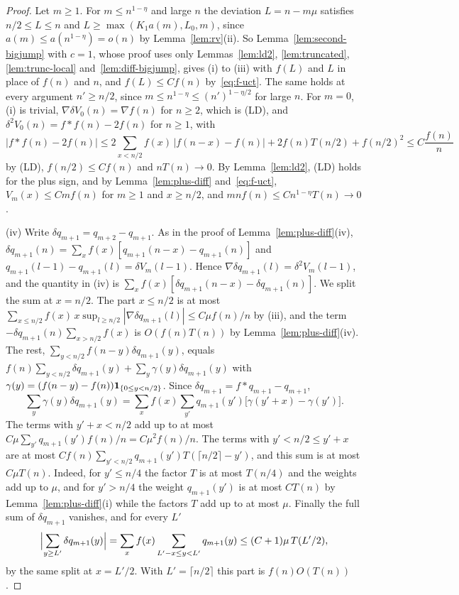 \begin{proof}
Let $m\ge1$. For $m\le n^{1-\eta}$ and large $n$ the deviation $L=n-m\mu$ satisfies
$n/2\le L\le n$ and $L\ge\max(K_1a(m),L_0,m)$, since $a(m)\le a(n^{1-\eta})=o(n)$ by
Lemma~\ref{lem:rv}(ii). So Lemma~\ref{lem:second-bigjump} with $c=1$, whose proof uses only
Lemmas~\ref{lem:ld2}, \ref{lem:truncated}, \ref{lem:trunc-local} and~\ref{lem:diff-bigjump}, gives
(i) to (iii) with $f(L)$ and $L$ in place of $f(n)$ and $n$, and $f(L)\le Cf(n)$
by~\eqref{eq:f-uct}. The same holds at every argument $n'\ge n/2$, since
$m\le n^{1-\eta}\le(n')^{1-\eta/2}$ for large $n$. For $m=0$, (i) is trivial,
$\nabla\delta V_0(n)=\nabla f(n)$ for $n\ge2$, which is (LD), and
$\delta^2V_0(n)=f*f(n)-2f(n)$ for $n\ge1$, with
\[
 |f*f(n)-2f(n)|\le2\sum_{x<n/2}f(x)\,|f(n-x)-f(n)|+2f(n)T(n/2)+f(n/2)^2\le C\frac{f(n)}n
\]
by (LD), $f(n/2)\le Cf(n)$ and $nT(n)\to0$. By Lemma~\ref{lem:ld2}, (LD) holds for the plus
sign, and by Lemma~\ref{lem:plus-diff} and~\eqref{eq:f-uct}, $V_m(x)\le Cmf(n)$ for $m\ge1$ and
$x\ge n/2$, and $mnf(n)\le Cn^{1-\eta}T(n)\to0$.

(iv) Write $\delta q_{m+1}=q_{m+2}-q_{m+1}$. As in the proof of Lemma~\ref{lem:plus-diff}(iv),
$\delta q_{m+1}(n)=\sum_xf(x)[q_{m+1}(n-x)-q_{m+1}(n)]$ and $q_{m+1}(l-1)-q_{m+1}(l)=\delta V_m(l-1)$.
Hence $\nabla\delta q_{m+1}(l)=\delta^2V_m(l-1)$, and the quantity in (iv) is
$\sum_xf(x)[\delta q_{m+1}(n-x)-\delta q_{m+1}(n)]$. We split the sum at $x=n/2$. The
part $x\le n/2$ is at most $\sum_{x\le n/2}f(x)\,x\sup_{l\ge n/2}|\nabla\delta q_{m+1}(l)|\le C\mu f(n)/n$
by (iii), and the term $-\delta q_{m+1}(n)\sum_{x>n/2}f(x)$ is $O(f(n)T(n))$ by
Lemma~\ref{lem:plus-diff}(iv). The rest, $\sum_{y<n/2}f(n-y)\delta q_{m+1}(y)$, equals
$f(n)\sum_{y<n/2}\delta q_{m+1}(y)+\sum_y\gamma(y)\delta q_{m+1}(y)$ with
$\gamma(y)=(f(n-y)-f(n))\mathbf{1}_{\{0\le y<n/2\}}$. Since
$\delta q_{m+1}=f*q_{m+1}-q_{m+1}$,
\[
 \sum_y\gamma(y)\delta q_{m+1}(y)=\sum_xf(x)\sum_{y'}q_{m+1}(y')\bigl[\gamma(y'+x)-\gamma(y')\bigr].
\]
The terms with $y'+x<n/2$ add up to at most $C\mu\sum_{y'}q_{m+1}(y')f(n)/n=C\mu^2f(n)/n$. The terms
with $y'<n/2\le y'+x$ are at most $Cf(n)\sum_{y'<n/2}q_{m+1}(y')T(\lceil n/2\rceil-y')$, and this
sum is at most $C\mu T(n)$. Indeed, for $y'\le n/4$ the factor $T$ is at most $T(n/4)$ and the
weights add up to $\mu$, and for $y'>n/4$ the weight $q_{m+1}(y')$ is at most $CT(n)$ by
Lemma~\ref{lem:plus-diff}(i) while the factors $T$ add up to at most $\mu$. Finally the full sum
of $\delta q_{m+1}$ vanishes, and for every $L'$
\[
 \Bigl|\sum_{y\ge L'}\delta q_{m+1}(y)\Bigr|=\sum_xf(x)\sum_{L'-x\le y<L'}q_{m+1}(y)\le(C+1)\mu\,T(L'/2),
\]
by the same split at $x=L'/2$. With $L'=\lceil n/2\rceil$ this part is $f(n)O(T(n))$.
\end{proof}

